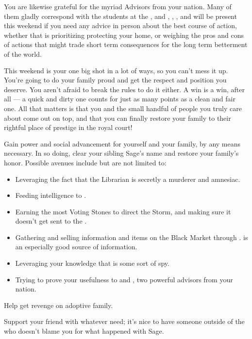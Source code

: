 \documentclass[char]{GL2020}
\begin{document}
You are likewise grateful for the myriad Advisors from your nation. Many of them gladly correspond with the students at the \pSchool{}, and \cEvil{\full}, \cWildCard{\intro}, \cHedonist{\full}, and \cCurse{\intro} will be present this weekend if you need any advice in person about the best course of action, whether that is prioritizing protecting your home, or weighing the pros and cons of actions that might trade short term consequences for the long term betterment of the world.

This weekend is your one big shot in a lot of ways, so you can't mess it up. You're going to do your family proud and get the respect and position you deserve. You aren't afraid to break the rules to do it either. A win is a win, after all — a quick and dirty one counts for just as many points as a clean and fair one. All that matters is that you and the small handful of people you truly care about come out on top, and that you can finally restore your family to their rightful place of prestige in the royal court! 

\begin{itemz}
    \item Gain power and social advancement for yourself and your family, by any means necessary. In so doing, clear your sibling Sage’s name and restore your family’s honor. Possible avenues include but are not limited to:
    \begin{itemize}
        \item Leveraging the fact that the Librarian is secretly a murderer and amnesiac.
        \item Feeding intelligence to \cHistory{}.
        \item Earning the most Voting Stones to direct the Storm, and making sure it doesn't get sent to the \pFarm{}.
        \item Gathering and selling information and items on the Black Market through \cChupSecond{}. \cEthics{} is an especially good source of information.
        \item Leveraging your knowledge that \cInterpol{} is some sort of spy.
        \item Trying to prove your usefulness to \cEvil{} and \cHedonist{}, two powerful advisors from your nation.
    \end{itemize}
    \item Help \cAdopted{} get revenge on \cAdopted{\their} adoptive family.
    \item Support your friend \cPresident{} with whatever \cPresident{\they} need\cPresident{\verbs}; it’s nice to have someone outside of the \pFarm{} who doesn’t blame you for what happened with Sage.
   \end{itemz}
\end{document}
